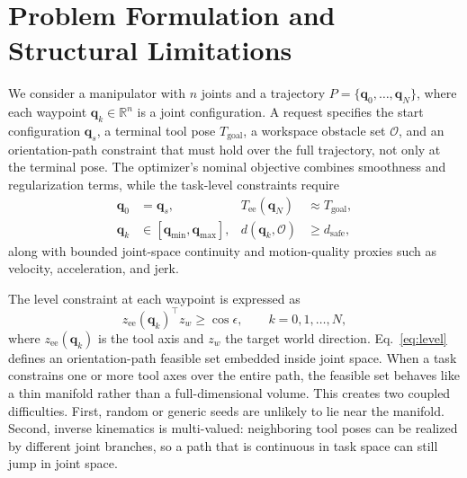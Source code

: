 \documentclass[conference]{IEEEtran/IEEEtran}
\newcommand{\qvec}{\mathbf{q}}
\newcommand{\Tgoal}{T_{\text{goal}}}
\newcommand{\zee}{z_{\text{ee}}}
\newcommand{\zw}{z_{w}}
\begin{document}
\section{Problem Formulation and Structural Limitations}
\label{sec:problem}
We consider a manipulator with $n$ joints and a trajectory
$P=\{\qvec_0,\ldots,\qvec_N\}$, where each waypoint
$\qvec_k\in\mathbb{R}^n$ is a joint configuration. A request specifies the
start configuration $\qvec_s$, a terminal tool pose $\Tgoal$, a workspace
obstacle set $\mathcal{O}$, and an orientation-path constraint that must hold
over the full trajectory, not only at the terminal pose. The optimizer's nominal
objective combines smoothness and regularization terms, while the task-level
constraints require
\begin{align}
  \qvec_0 &= \qvec_s, &
  T_{\mathrm{ee}}(\qvec_N) &\approx \Tgoal, \nonumber\\
  \qvec_k &\in [\qvec_{\min},\qvec_{\max}], &
  d(\qvec_k,\mathcal{O}) &\ge d_{\mathrm{safe}},
  \label{eq:problem-constraints}
\end{align}
along with bounded joint-space continuity and motion-quality proxies such as
velocity, acceleration, and jerk.

The level constraint at each waypoint is expressed as
\begin{equation}
  \zee(\qvec_k)^\top \zw \ge \cos\epsilon, \qquad k = 0,1,\dots,N,
  \label{eq:level}
\end{equation}
where $\zee(\qvec_k)$ is the tool axis and $\zw$ the target world direction.
Eq.~\eqref{eq:level} defines an orientation-path feasible set embedded inside
joint space. When a task constrains one or more tool axes over the entire path,
the feasible set behaves like a thin manifold rather than a full-dimensional
volume. This creates two coupled difficulties. First, random or generic seeds
are unlikely to lie near the manifold. Second, inverse kinematics is
multi-valued: neighboring tool poses can be realized by different joint
branches, so a path that is continuous in task space can still jump in joint
space.
\end{document}
